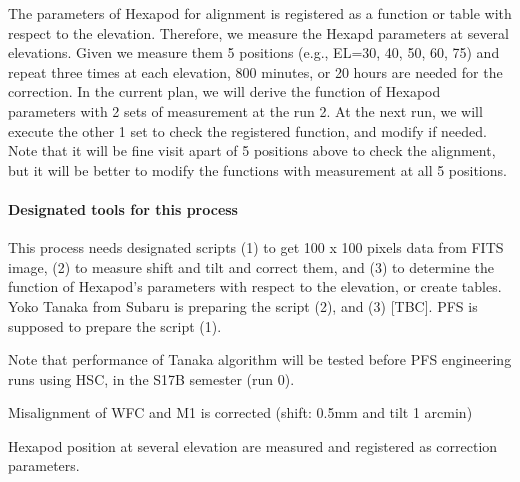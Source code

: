 The parameters of Hexapod for alignment is registered as a function or table with respect to the elevation.
Therefore, we measure the Hexapd parameters at several elevations.
Given we measure them 5 positions (e.g., EL=30, 40, 50, 60, 75) and repeat three times at each elevation, 800 minutes, or 20 hours are needed for the correction.
In the current plan, we will derive the function of Hexapod parameters with 2 sets of measurement at the run 2.
At the next run, we will execute the other 1 set to check the registered function, and modify if needed.
Note that it will be fine visit apart of 5 positions above to check the alignment, but it will be better to modify the functions with measurement at all 5 positions.

\smallskip
\paragraph{Designated tools for this process}
This process needs designated scripts
(1) to get 100 x 100 pixels data from FITS image,
(2) to measure shift and tilt and correct them, and
(3) to determine the function of Hexapod's parameters with respect to the elevation, or create tables. 
Yoko Tanaka from Subaru is preparing the script (2), and (3) [TBC].
PFS is supposed to prepare the script (1).

Note that performance of Tanaka algorithm will be tested before PFS engineering runs using HSC, in the S17B semester (run 0).

\begin{itembox}[l]{}
Misalignment of  WFC and M1 is corrected (shift: 0.5mm and tilt 1 arcmin)

Hexapod position at several elevation are measured and registered as correction parameters.

\end{itembox}